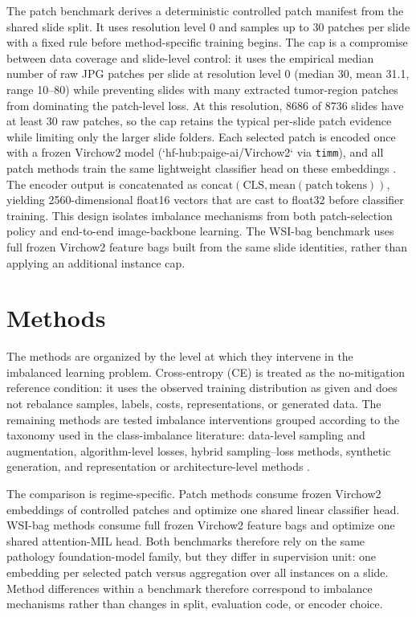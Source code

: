 \documentclass[11pt]{article}
\begin{document}
The patch benchmark derives a deterministic controlled patch manifest from the shared slide split. It uses resolution level 0 and samples up to 30 patches per slide with a fixed rule before method-specific training begins. The cap is a compromise between data coverage and slide-level control: it uses the empirical median number of raw JPG patches per slide at resolution level 0 (median 30, mean 31.1, range 10--80) while preventing slides with many extracted tumor-region patches from dominating the patch-level loss. At this resolution, 8686 of 8736 slides have at least 30 raw patches, so the cap retains the typical per-slide patch evidence while limiting only the larger slide folders. Each selected patch is encoded once with a frozen Virchow2 model (`hf-hub:paige-ai/Virchow2` via \texttt{timm}), and all patch methods train the same lightweight classifier head on these embeddings \citep{zimmermann2024virchow2,vorontsov2024virchow}. The encoder output is concatenated as $\mathrm{concat}(\mathrm{CLS}, \mathrm{mean}(\mathrm{patch\ tokens}))$, yielding 2560-dimensional float16 vectors that are cast to float32 before classifier training. This design isolates imbalance mechanisms from both patch-selection policy and end-to-end image-backbone learning. The WSI-bag benchmark uses full frozen Virchow2 feature bags built from the same slide identities, rather than applying an additional instance cap.

\section{Methods}
The methods are organized by the level at which they intervene in the imbalanced learning problem. Cross-entropy (CE) is treated as the no-mitigation reference condition: it uses the observed training distribution as given and does not rebalance samples, labels, costs, representations, or generated data. The remaining methods are tested imbalance interventions grouped according to the taxonomy used in the class-imbalance literature: data-level sampling and augmentation, algorithm-level losses, hybrid sampling--loss methods, synthetic generation, and representation or architecture-level methods \citep{saini2023tacklingClass,zhang2023deepLong}.

The comparison is regime-specific. Patch methods consume frozen Virchow2 embeddings of controlled patches and optimize one shared linear classifier head. WSI-bag methods consume full frozen Virchow2 feature bags and optimize one shared attention-MIL head. Both benchmarks therefore rely on the same pathology foundation-model family, but they differ in supervision unit: one embedding per selected patch versus aggregation over all instances on a slide. Method differences within a benchmark therefore correspond to imbalance mechanisms rather than changes in split, evaluation code, or encoder choice.
\end{document}
